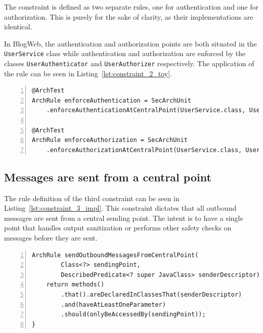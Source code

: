 The constraint is defined as two separate rules, one for authentication and one for authorization. This is purely for the sake of clarity, as their implementations are identical.

In BlogWeb, the authentication and authorization points are both situated in the \texttt{UserService} class while authentication and authorization are enforced by the classes \texttt{UserAuthenticator} and \texttt{UserAuthorizer} respectively. The application of the rule can be seen in Listing~\ref{lst:constraint_2_toy}.

\begin{minipage}{\linewidth}
\begin{lstlisting}[caption={Application of constraint 2 to BlogWeb.}, captionpos=b, label=lst:constraint_2_toy, numbers=left]
@ArchTest
ArchRule enforceAuthentication = SecArchUnit
    .enforceAuthenticationAtCentralPoint(UserService.class, UserAuthenticator.class);

@ArchTest
ArchRule enforceAuthorization = SecArchUnit
    .enforceAuthorizationAtCentralPoint(UserService.class, UserAuthorizer.class);
\end{lstlisting}
\end{minipage}

\subsection{Messages are sent from a central point}
The rule definition of the third constraint can be seen in Listing~\ref{lst:constraint_3_impl}.
This constraint dictates that all outbound messages are sent from a central sending point. The intent is to have a single point that handles output sanitization or performs other safety checks on messages before they are sent. 

\begin{minipage}{\linewidth}
\begin{lstlisting}[caption={Rule definition for constraint 3.}, captionpos=b, label=lst:constraint_3_impl, numbers=left]
ArchRule sendOutboundMessagesFromCentralPoint(
        Class<?> sendingPoint,
        DescribedPredicate<? super JavaClass> senderDescriptor) {
    return methods()
        .that().areDeclaredInClassesThat(senderDescriptor)
        .and(haveAtLeastOneParameter)
        .should(onlyBeAccessedBy(sendingPoint));
}
\end{lstlisting}
\end{minipage}

